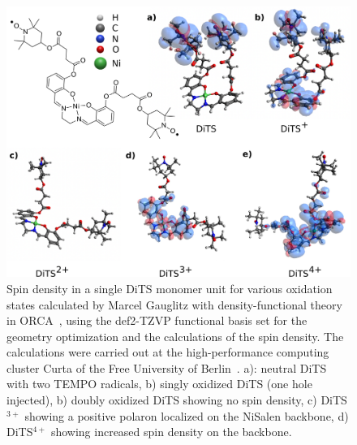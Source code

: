 \begin{figure}[h]
\center
	\includegraphics[width=1\textwidth]{./electrochemistry/figures/DFT_DITS.pdf}
	\caption{Spin density in a single DiTS monomer unit for various oxidation states calculated by Marcel Gauglitz with density-functional theory in ORCA~\cite{ORCA}, using the def2-TZVP functional basis set for the geometry optimization and the calculations of the spin density. The calculations were carried out at the high-performance computing cluster Curta of the Free University of Berlin~\cite{Curta}. a): neutral DiTS with two TEMPO radicals, b) singly oxidized DiTS (one hole injected), b) doubly oxidized DiTS showing no spin density, c) DiTS$^{3+}$ showing a positive polaron localized on the NiSalen backbone, d) DiTS$^{4+}$ showing increased spin density on the backbone.}
	\label{fig:DiTS_DFT}
\end{figure}


